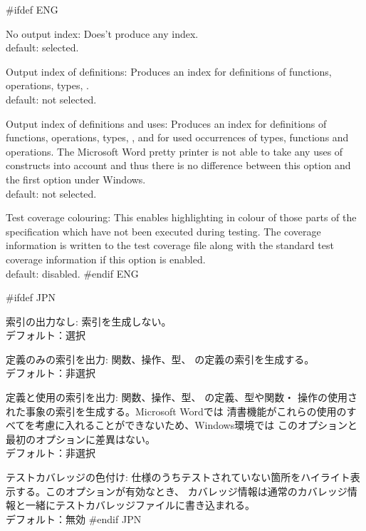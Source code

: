 \documentclass[\pformat,12pt]{article}
\newcommand{\guicmd}[1]{{\sf #1}}
\newcommand{\guicmd}[1]{{\gt #1}}
\begin{document}
\begin{list}{}{}

#ifdef ENG
\item[{\sf No output index}:] Does't produce any index. \\
  default: selected.

\item[{\sf Output index of definitions}:] Produces an index for
  definitions of functions, operations, types,
  . \\
  default: not selected.
  
\item[{\sf Output index of definitions and uses}:] Produces an index for
  definitions of functions, operations, types,
  ,
    and for used occurrences of types,
    functions and operations. The Microsoft Word pretty printer is not
    able to take any uses of constructs into account and thus there is
    no difference between this option and the first option under Windows.\\ 
  default: not selected.

\item[{\sf Test coverage colouring}:] This enables highlighting
  in colour of those parts of the specification which have not been
  executed during testing. The coverage information is written to the
  test coverage file along with the standard test coverage information
  if this option is enabled. \\
  default: disabled.
#endif ENG

#ifdef JPN
\item[{\guicmd{索引の出力なし}}:]
  索引を生成しない。\\
  デフォルト：選択

\item[{\guicmd{定義のみの索引を出力}}:]
  関数、操作、型、
    の定義の索引を生成する。\\
  デフォルト：非選択

\item[{\guicmd{定義と使用の索引を出力}}:]
  関数、操作、型、
   の定義、型や関数・
  操作の使用された事象の索引を生成する。Microsoft Wordでは
  清書機能がこれらの使用のすべてを考慮に入れることができないため、Windows環境では
  このオプションと最初のオプションに差異はない。\\
  デフォルト：非選択

\item[{\guicmd{テストカバレッジの色付け}}:]
  仕様のうちテストされていない箇所をハイライト表示する。このオプションが有効なとき、
  カバレッジ情報は通常のカバレッジ情報と一緒にテストカバレッジファイルに書き込まれる。\\
  デフォルト：無効
#endif JPN

\end{list}
\end{document}
